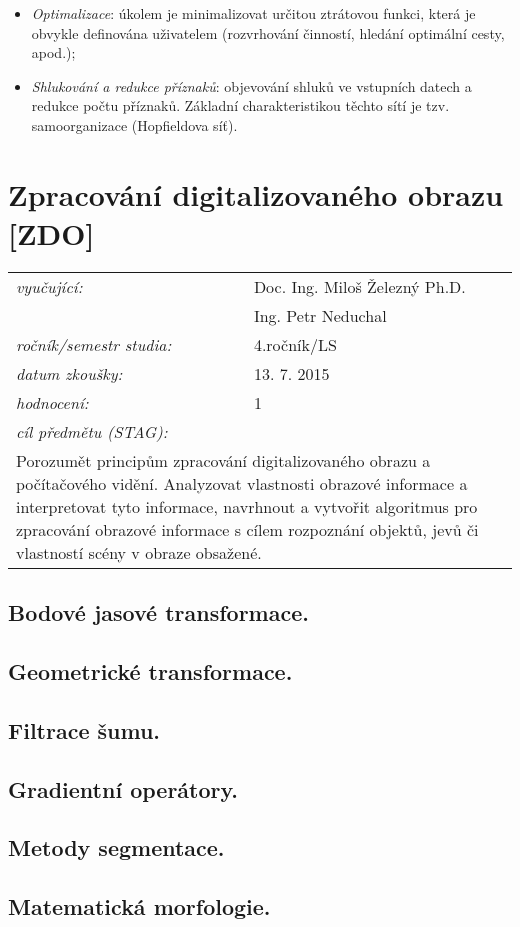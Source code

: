 \begin{itemize}
\item \textit{Optimalizace}: úkolem je minimalizovat určitou ztrátovou funkci, která je obvykle definována uživatelem (rozvrhování činností, hledání optimální cesty, apod.);
\item \textit{Shlukování a redukce příznaků}: objevování shluků ve vstupních datech a redukce počtu příznaků. Základní charakteristikou těchto sítí je tzv. samoorganizace (Hopfieldova síť).
\end{itemize}

\section{Zpracování digitalizovaného obrazu [ZDO]}

\begin{table}[H]
\centering
\begin{tabular}{p{4cm} p{12cm}}
\textit{vyučující:}             & Doc. Ing. Miloš Železný Ph.D. \\
								 & Ing. Petr Neduchal \\
\textit{ročník/semestr studia:} & 4.ročník/LS \\
\textit{datum zkoušky:}         & 13. 7. 2015 \\
\textit{hodnocení:}             & 1 \\
\textit{cíl předmětu (STAG):}   & \\
\multicolumn{2}{p{16cm}}{Porozumět principům zpracování digitalizovaného obrazu a počítačového vidění. Analyzovat vlastnosti obrazové informace a interpretovat tyto informace, navrhnout a vytvořit algoritmus pro zpracování obrazové informace s cílem rozpoznání objektů, jevů či vlastností scény v obraze obsažené.}
\end{tabular}
\end{table}

\subsection{Bodové jasové transformace.}

\subsection{Geometrické transformace.}

\subsection{Filtrace šumu.}

\subsection{Gradientní operátory.}

\subsection{Metody segmentace.}

\subsection{Matematická morfologie.}